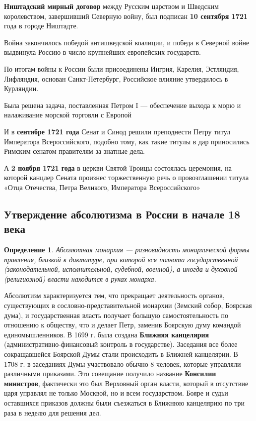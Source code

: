 \documentclass{article}
\newtheorem{definition}{Определение}
\begin{document}
\hfill

\textbf{Ништадский мирный договор} между Русским царством и Шведским королевством, завершивший Северную войну, был подписан \textbf{10 сентября 1721} года в городе Ништадте.

Война закончилось победой антишведской коалиции, и победа в Северной войне выдвинула Россию в число крупнейших европейских государств.

По итогам войны к России были присоединены Ингрия, Карелия, Эстляндия, Лифляндия, основан Санкт-Петербург, Российское влияние утвердилось в Курляндии.

Была решена задача, поставленная Петром I — обеспечение выхода к морю и налаживание морской торговли с Европой

\hfill

И в \textbf{сентябре 1721 года} Сенат и Синод решили преподнести Петру титул Императора Всероссийского, подобно тому, как такие титулы в дар приносились Римским сенатом правителям за знатные дела.

А \textbf{2 ноября 1721 года} в церкви Святой Троицы состоялась церемония, на которой канцлер Сената произнес торжественную речь о провозглашении титула «Отца Отечества, Петра Великого, Императора Всероссийского»

\pagebreak
\subsection{Утверждение абсолютизма в России в начале 18 века}

\begin{definition}
    Абсолютная монархия — разновидность монархической формы правления, близкой к диктатуре, при которой вся полнота государственной (законодательной, исполнительной, судебной, военной), а иногда и духовной (религиозной) власти находится в руках монарха.
\end{definition}

Абсолютизм характеризуется тем, что прекращает деятельность органов, существующих в сословно-представительной монархии (Земский собор, Боярская дума), и государственная власть получает большую самостоятельность по отношению к обществу, что и делает Петр, заменив Боярскую думу командой единомышленников. В 1699 г. была создана \textbf{Ближняя канцелярия} (административно-финансовый контроль в государстве). Заседания все более сокращавшейся Боярской Думы стали происходить в Ближней канцелярии. В 1708 г. в заседаниях Думы участвовало обычно 8 человек, которые управляли различными приказами. Это совещание получило название \textbf{Консилии министров}, фактически это был Верховный орган власти, который в отсутствие царя управлял не только Москвой, но и всем государством. Бояре и судьи оставшихся приказов должны были съезжаться в Ближнюю канцелярию по три раза в неделю для решения дел.
\end{document}
